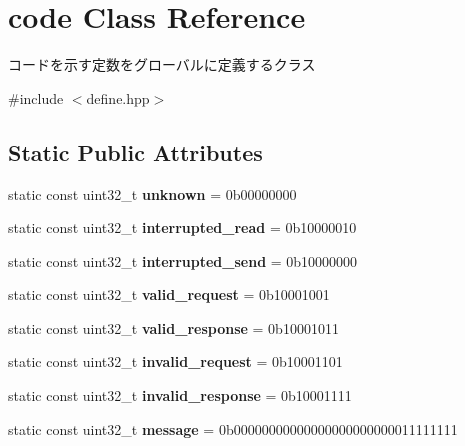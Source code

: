 \hypertarget{classcode}{}\section{code Class Reference}
\label{classcode}


コードを示す定数をグローバルに定義するクラス  




{\ttfamily \#include $<$define.\+hpp$>$}

\subsection*{Static Public Attributes}
\begin{DoxyCompactItemize}
\item 
\mbox{\label{classcode_a98e6bcd6d22d11ee680cc99e4f7fefd2}} 
static const uint32\+\_\+t {\bfseries unknown} = 0b00000000
\item 
\mbox{\label{classcode_a9d80011755170ca7a2ccdc401325cf24}} 
static const uint32\+\_\+t {\bfseries interrupted\+\_\+read} = 0b10000010
\item 
\mbox{\label{classcode_aef8a9d2006b9218aad97347513d5d09f}} 
static const uint32\+\_\+t {\bfseries interrupted\+\_\+send} = 0b10000000
\item 
\mbox{\label{classcode_ac2a2c92f84ee2ba636343e17af5cb7cb}} 
static const uint32\+\_\+t {\bfseries valid\+\_\+request} = 0b10001001
\item 
\mbox{\label{classcode_a2a1a70d1eba308f045e4f62de0e4d508}} 
static const uint32\+\_\+t {\bfseries valid\+\_\+response} = 0b10001011
\item 
\mbox{\label{classcode_ae4af9e75851287c5cb09daef7d160fde}} 
static const uint32\+\_\+t {\bfseries invalid\+\_\+request} = 0b10001101
\item 
\mbox{\label{classcode_aadbf6f56657d452f5a1b9bc8b692ae16}} 
static const uint32\+\_\+t {\bfseries invalid\+\_\+response} = 0b10001111
\item 
\mbox{\label{classcode_aff7c0358c8fe6eba2b0505433378ae5a}} 
static const uint32\+\_\+t {\bfseries message} = 0b00000000\textquotesingle{}00000000\textquotesingle{}00000000\textquotesingle{}11111111

\end{DoxyCompactItemize}
